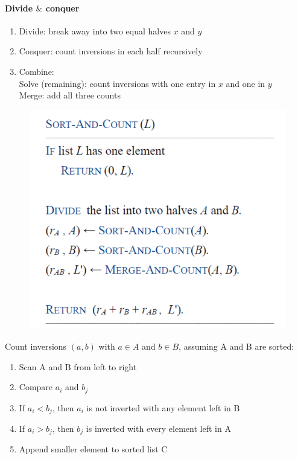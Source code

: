 \documentclass[11pt]{article}
\begin{document}
\paragraph{Divide $\&$ conquer}
\begin{enumerate} 
	\item Divide: break away into two equal halves $x$ and $y$
	\item Conquer: count inversions in each half recursively
	\item Combine: \\
	Solve (remaining): count inversions with one entry in $x$ and one in $y$ \\
	Merge: add all three counts
\end{enumerate}

\begin{figure}[h]
	\centering
	\includegraphics[scale=0.45]{p1}
\end{figure}

Count inversions $(a,b)$ with $a \in A$ and $b \in B$, assuming A and B are sorted:
\begin{enumerate}
	\item Scan A and B from left to right
	\item Compare $a_i$ and $b_j$
	\item If $a_i < b_j$, then $a_i$ is not inverted with any element left in B
	\item If $a_i > b_j$, then $b_j$ is inverted with every element left in A
	\item Append smaller element to sorted list C
\end{enumerate}
\end{document}
